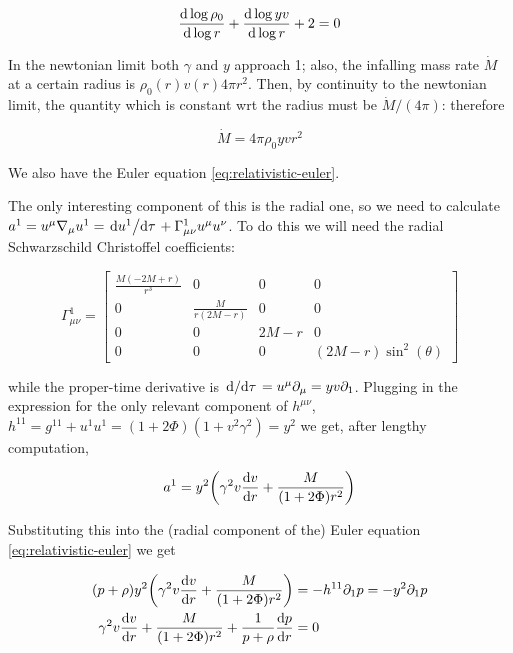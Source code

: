 \documentclass[main.tex]{subfiles}
\begin{document}
\begin{equation} \label{eq:differential-continuity}
  \dv{\log \rho_0}{\log r} +
  \dv{\log yv}{\log r} + 2 = 0
\end{equation}

In the newtonian limit both $\gamma$ and $y$ approach 1; also, the infalling mass rate $\Dot{M}$ at a certain radius is $\rho_0 (r) v(r) 4\pi r^2$. Then, by continuity to the newtonian limit, the quantity which is constant wrt the radius must be $\Dot{M} / (4\pi)$: therefore

\begin{equation}
  \dot{M} = 4 \pi\rho_0 yvr^2
\end{equation}

We also have the Euler equation \eqref{eq:relativistic-euler}.

The only interesting component of this is the radial one, so we need to calculate \(a^1 = u^\mu \nabla_\mu u^1 = \dv*{u^1}{\tau} + \Gamma^1_{\mu \nu} u^\mu u^\nu \). To do this we will need the radial Schwarzschild Christoffel coefficients:

\begin{equation}
  \Gamma^1_{\mu \nu} = \left[\begin{matrix}\frac{M \left(- 2 M + r\right)}{r^{3}} & 0 & 0 & 0\\0 & \frac{M}{r \left(2 M - r\right)} & 0 & 0\\0 & 0 & 2 M - r & 0\\0 & 0 & 0 & \left(2 M - r\right) \sin^{2}{\left(\theta \right)}\end{matrix}\right]
\end{equation}

while the proper-time derivative is \(\dv*{}{\tau} = u^\mu \partial_\mu = yv\partial_1\).
Plugging in the expression for the only relevant component of \(h^{\mu\nu}\), \(h^{11} = g^{11} + u^1 u^1 = (1 + 2 \Phi) (1 + v^2 \gamma^2) = y^2\)
we get, after lengthy computation,

\begin{equation}
  a^1 = y^2 \qty(\gamma^2 v \dv{v}{r} + \frac{M}{(1+ 2 \Phi) r^2})
\end{equation}

Substituting this into the (radial component of the) Euler equation \eqref{eq:relativistic-euler} we get

\begin{subequations}
\begin{align}
  (p + \rho) y^2 \qty(\gamma^2 v \dv{v}{r} + \frac{M}{(1+ 2 \Phi) r^2}) &= - h^{1 1} \partial_1 p = - y^2 \partial_1 p \\
   \gamma^2 v \dv{v}{r} + \frac{M}{(1+ 2 \Phi) r^2} + \frac{1}{p + \rho} \dv{p}{r} &= 0
  \label{eq:ideal-euler}
\end{align}
\end{subequations}
\end{document}
